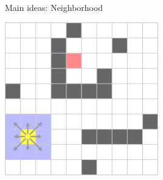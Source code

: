 \documentclass{presentation}
\begin{document}
\begin{frame}
\end{frame}


\begin{frame}{Main ideas: Neighborhood}
	\begin{center}
		\includegraphics[width=0.5\textwidth]{figures/A-Stern_geschnitten(241x241)/2.png}
	\end{center}
\end{frame}
\end{document}
